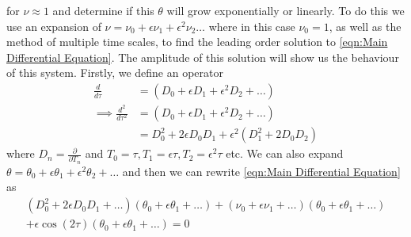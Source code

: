 \documentclass[12pt]{article}
\begin{document}
\begin{enumerate}
\begin{enumerate}
            for $\nu \approx 1$ and determine if this $\theta$ will grow exponentially or linearly. 
            To do this we use an expansion of $\nu = \nu_0 +\epsilon\nu_1+\epsilon^2\nu_2\dots$ 
            where in this case $\nu_0 = 1$, as well as the method of multiple time scales, to find 
            the leading order solution to \autoref{eqn:Main Differential Equation}. The amplitude of 
            this solution will show us the behaviour of this system. \newline
            \newline
            Firstly, we define an operator
            \begin{equation*}
                \begin{split}
                    \frac{d}{d\tau} &= (D_0+\epsilon D_1+\epsilon^2 D_2+\dots) \\
                    \implies \frac{d^2}{d\tau^2} &= (D_0+\epsilon D_1+\epsilon^2 D_2+\dots) \\
                    &= D_0^2 + 2\epsilon D_0D_1 +\epsilon^2(D_1^2+2D_0D_2)
                \end{split}
            \end{equation*}
            where $D_n = \frac{\partial}{\partial T_n}$ and $T_0=\tau, T_1=\epsilon\tau, T_2=\epsilon^2\tau$ etc. 
            We can also expand $\theta = \theta_0+\epsilon\theta_1+\epsilon^2\theta_2+\dots$ and then we 
            can rewrite \autoref{eqn:Main Differential Equation} as 
            \begin{equation}
                \begin{gathered}
                    (D_0^2 + 2\epsilon D_0D_1 +\dots)(\theta_0+\epsilon\theta_1+\dots)+(\nu_0 +\epsilon\nu_1+\dots)(\theta_0+\epsilon\theta_1+\dots) \\
                    +\epsilon\cos(2\tau)(\theta_0+\epsilon\theta_1+\dots) = 0
                \end{gathered}
                \label{eqn:Expanded Main Differential Equation A}
            \end{equation}


\end{enumerate}
\end{enumerate}
\end{document}
